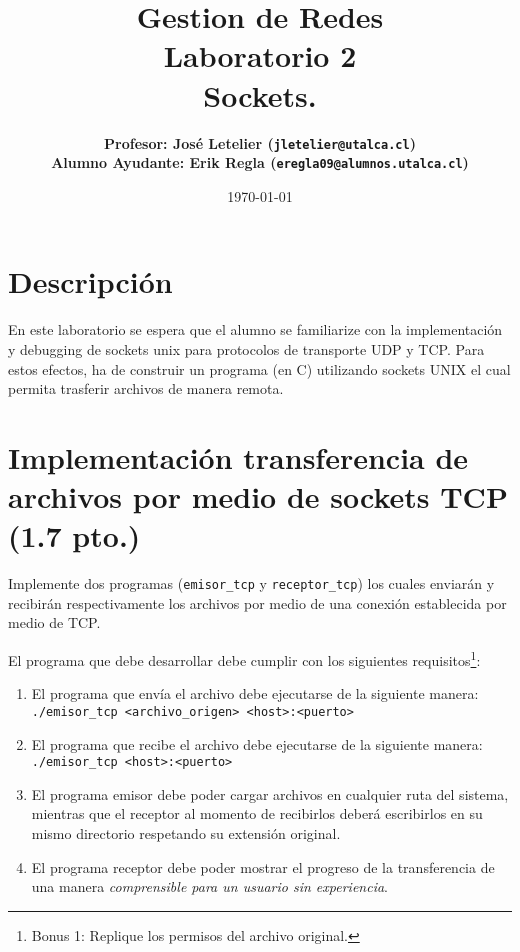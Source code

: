 \documentclass[11pt]{utalcaDoc}
\title{{\bf Gestion de Redes}\\Laboratorio 2\\Sockets.}
\author{
    \bf{Profesor:} José Letelier (\texttt{jletelier@utalca.cl})\\ 
    \bf{Alumno Ayudante:} Erik Regla (\texttt{eregla09@alumnos.utalca.cl})\\ }
\date{\today}
\begin{document}
\renewcommand{\figurename}{Figura~}
\renewcommand{\tablename}{Tabla~}

\maketitle

\section{Descripción}
En este laboratorio se espera que el alumno se familiarize con la implementación y debugging
de sockets unix para protocolos de transporte UDP y TCP. Para estos efectos, ha de construir un
programa (en C) utilizando sockets UNIX el cual permita trasferir archivos de manera remota.

\section{Implementación transferencia de archivos por medio de sockets TCP (1.7 pto.)}
Implemente dos programas (\texttt{emisor_tcp} y \texttt{receptor_tcp}) los cuales enviarán y recibirán respectivamente los archivos por medio de una conexión establecida por medio de TCP. 

El programa que debe desarrollar debe cumplir con los siguientes requisitos\footnote{ Bonus 1: Replique los permisos del archivo original. }:
\begin{enumerate}
    \item{ El programa que envía el archivo debe ejecutarse de la siguiente manera:\\ \texttt{./emisor_tcp <archivo_origen> <host>:<puerto>}}

    \item{ El programa que recibe el archivo debe ejecutarse de la siguiente manera:\\ \texttt{./emisor_tcp <host>:<puerto>}}

    \item{ El programa emisor debe poder cargar archivos en cualquier ruta del sistema, mientras que el receptor al momento de recibirlos deberá escribirlos en su mismo directorio respetando su extensión original. }

    \item{ El programa receptor debe poder mostrar el progreso de la transferencia de una manera \textit{comprensible para un usuario sin experiencia}. }
\end{enumerate}
\end{document}
